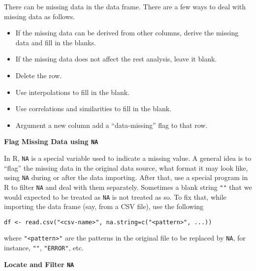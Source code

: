 There can be missing data in the data frame. There are a few ways to deal with missing data as follows.
\begin{itemize}
	\item If the missing data can be derived from other columns, derive the missing data and fill in the blanks.
	\item If the missing data does not affect the rest analysis, leave it blank.
	\item Delete the row.
	\item Use interpolations to fill in the blank.
	\item Use correlations and similarities to fill in the blank.
	\item Argument a new column add a ``data-missing'' flag to that row.
\end{itemize}

\vspace{0.1in}
\noindent \textbf{Flag Missing Data using \texttt{NA}}
\vspace{0.1in}

In R, \verb|NA| is a special variable used to indicate a missing value. A general idea is to ``flag'' the missing data in the original data source, what format it may look like, using \verb|NA| during or after the data importing. After that, use a special program in R to filter \verb|NA| and deal with them separately. Sometimes a blank string \verb|""| that we would expected to be treated as \verb|NA| is not treated as so. To fix that, while importing the data frame (say, from a CSV file), use the following
\begin{lstlisting}
df <- read.csv("<csv-name>", na.string=c("<pattern>", ...))
\end{lstlisting}
where \verb|"<pattern>"| are the patterns in the original file to be replaced by \verb|NA|, for instance, \verb|""|, \verb|"ERROR"|, etc.

\vspace{0.1in}
\noindent \textbf{Locate and Filter \texttt{NA}}
\vspace{0.1in}

